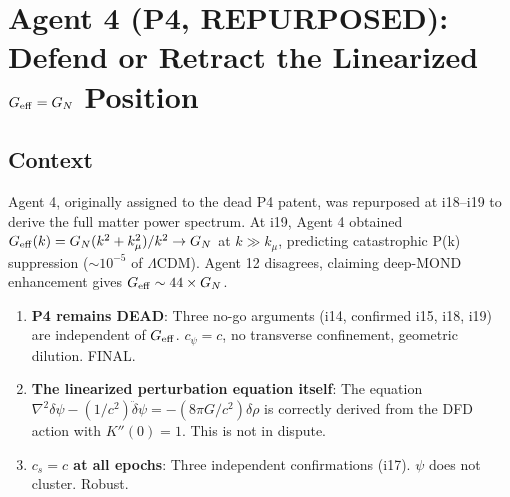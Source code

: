 \documentclass[11pt]{article}
\newcommand{\dpsi}{\delta\psi}
\newcommand{\Geff}{G_{\rm eff}}
\newcommand{\kmu}{k_\mu}
\newcommand{\LCDM}{$\Lambda$CDM}
\theoremstyle{remark}
\begin{document}
\newpage
\section{Agent 4 (P4, REPURPOSED): Defend or Retract the Linearized $\Geff = G_N$ Position}
\label{sec:agent4}

\subsection{Context}
Agent 4, originally assigned to the dead P4 patent, was repurposed at i18--i19 to
derive the full matter power spectrum. At i19, Agent 4 obtained $\Geff(k) = G_N(k^2 +
\kmu^2)/k^2 \to G_N$ at $k \gg \kmu$, predicting catastrophic P(k) suppression
($\sim 10^{-5}$ of \LCDM). Agent 12 disagrees, claiming deep-MOND enhancement gives
$\Geff \sim 44 \times G_N$.

\begin{survivebox}
\begin{enumerate}
\item \textbf{P4 remains DEAD}: Three no-go arguments (i14, confirmed i15, i18, i19)
  are independent of $\Geff$. $c_\psi = c$, no transverse confinement, geometric
  dilution. FINAL.
\item \textbf{The linearized perturbation equation itself}: The equation
  $\nabla^2 \dpsi - (1/c^2)\ddot\dpsi = -(8\pi G/c^2)\delta\rho$ is correctly
  derived from the DFD action with $K''(0) = 1$. This is not in dispute.
\item \textbf{$c_s = c$ at all epochs}: Three independent confirmations (i17).
  $\psi$ does not cluster. Robust.
\end{enumerate}
\end{survivebox}
\end{document}
